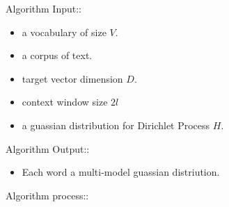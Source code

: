 \documentclass{article}
\begin{document}
Algorithm Input:: \newline
\begin{itemize}
 \item a vocabulary of size $V$.
 \item a corpus of text.
 \item target vector dimension $D$.
 \item context window size $2l$
 \item a guassian distribution for Dirichlet Process $H$.
\end{itemize}

Algorithm Output::\newline
\begin{itemize}
\item Each word a multi-model guassian distriution.
\end{itemize}

Algorithm process::\newline
\end{document}
